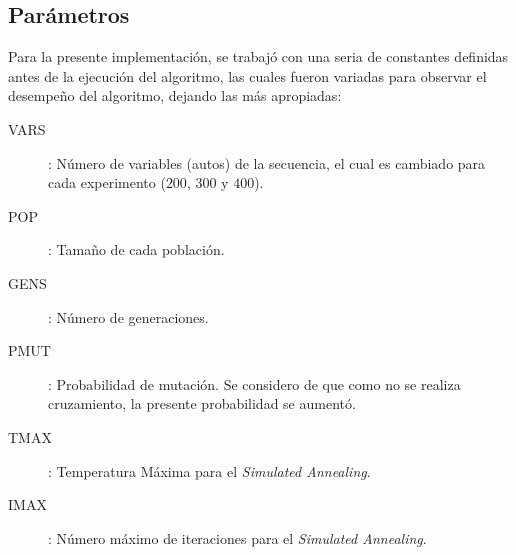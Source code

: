 \subsection{Parámetros}

Para la presente implementación, se trabajó con una seria de constantes definidas antes de la ejecución del algoritmo,
las cuales fueron variadas para observar el desempeño del algoritmo, dejando las más apropiadas:
\begin{description}
	\item[VARS]: Número de variables (autos) de la secuencia, el cual es cambiado para cada experimento ($200$, $300$ y $400$).
	\item[POP]:  Tamaño de cada población.
	\item[GENS]: Número de generaciones.
	\item[PMUT]: Probabilidad de mutación. Se considero de que como no se realiza cruzamiento, la presente probabilidad se aumentó.
	\item[TMAX]: Temperatura Máxima para el \emph{Simulated Annealing}.
	\item[IMAX]: Número máximo de iteraciones para el \emph{Simulated Annealing}.
\end{description}
